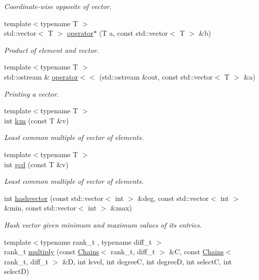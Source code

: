 \begin{DoxyCompactItemize}
\begin{DoxyCompactList}\small\item\em Coordinate-\/wise opposite of vector. \end{DoxyCompactList}\item 
{\footnotesize template$<$typename T $>$ }\\std\+::vector$<$ T $>$ \hyperlink{namespaceMackey_ae235ee5dd92dc1ca64388b8fbb1b4d75}{operator$\ast$} (T a, const std\+::vector$<$ T $>$ \&b)
\begin{DoxyCompactList}\small\item\em Product of element and vector. \end{DoxyCompactList}\item 
{\footnotesize template$<$typename T $>$ }\\std\+::ostream \& \hyperlink{namespaceMackey_aa4da3e3b46b9cb20f3be57d7e5da2d5d}{operator$<$$<$} (std\+::ostream \&out, const std\+::vector$<$ T $>$ \&a)
\begin{DoxyCompactList}\small\item\em Printing a vector. \end{DoxyCompactList}\item 
{\footnotesize template$<$typename T $>$ }\\int \hyperlink{namespaceMackey_a5d8ae76ffb9440e27bfca124d26ee1b2}{lcm} (const T \&v)
\begin{DoxyCompactList}\small\item\em Least common multiple of vector of elements. \end{DoxyCompactList}\item 
{\footnotesize template$<$typename T $>$ }\\int \hyperlink{namespaceMackey_a9c9c2faea24be988cdfcd773360134be}{gcd} (const T \&v)
\begin{DoxyCompactList}\small\item\em Least common multiple of vector of elements. \end{DoxyCompactList}\item 
int \hyperlink{namespaceMackey_ae57418329a761aa68d26d68b637fe9dd}{hashvector} (const std\+::vector$<$ int $>$ \&deg, const std\+::vector$<$ int $>$ \&min, const std\+::vector$<$ int $>$ \&max)
\begin{DoxyCompactList}\small\item\em Hash vector given minimum and maximum values of its entries. \end{DoxyCompactList}\item 
{\footnotesize template$<$typename rank\+\_\+t , typename diff\+\_\+t $>$ }\\rank\+\_\+t \hyperlink{namespaceMackey_a80dbde3a859378ede596b48869ec50d9}{multiply} (const \hyperlink{classMackey_1_1Chains}{Chains}$<$ rank\+\_\+t, diff\+\_\+t $>$ \&C, const \hyperlink{classMackey_1_1Chains}{Chains}$<$ rank\+\_\+t, diff\+\_\+t $>$ \&D, int level, int degreeC, int degreeD, int selectC, int selectD)

\end{DoxyCompactItemize}
